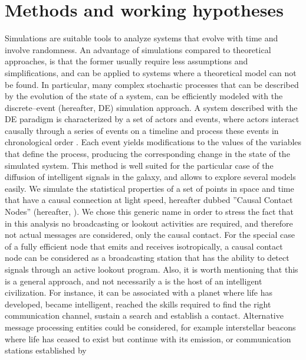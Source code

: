 \section{Methods and working hypotheses}\label{S_methods}

Simulations are suitable tools to analyze systems that evolve with
time and involve randomness.
%
An advantage of simulations compared to theoretical approaches, is
that the former usually require less assumptions and simplifications,
and can be applied to systems where a theoretical model can not be
found.
%
In particular, many complex stochastic processes that can be described
by the evolution of the state of a system, can be efficiently modeled
with the discrete--event (hereafter, DE) simulation approach.
%
A system described with the DE paradigm is characterized by a set of
actors and events, where actors interact causally through a series of
events on a timeline and process these events in chronological order
\citep{ptolemaeus_system_2014, chung_simulation_2003,
ross_simulation_2012}.
%
Each event yields modifications to the values of the variables that define
the process, producing the corresponding change in the state of the
simulated system.
%
This method is well suited for the particular case of the diffusion of
intelligent signals in the galaxy, and allows to explore several
models easily.
%
We simulate the statistical properties of a set of points in space and
time that have a causal connection at light speed, hereafter dubbed
''Causal Contact Nodes'' (hereafter, \ceti{}).
%
We chose this generic name in order to stress the fact that in this
analysis no broadcasting or lookout activities are required, and
therefore not actual messages are considered, only the causal contact.
%
For the special case of a fully efficient node that emits and receives
isotropically, a causal contact node can be considered as a
broadcasting station that has the ability to detect signals through an
active lookout program.
%
Also, it is worth mentioning that this is a general approach, and not
necessarily a \ceti{} is the host of an intelligent civilization.
%
For instance, it can be associated with a planet where life has developed, became
intelligent, reached the skills required to find the right
communication channel, sustain a search and establish a contact.
%
Alternative message processing entities could be considered, for
example interstellar beacons where life has ceased to exist but
continue with its emission, or communication stations established by
